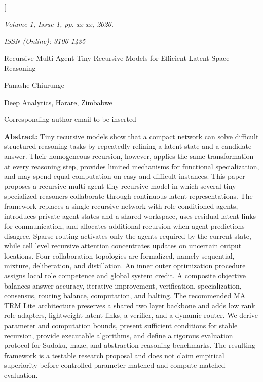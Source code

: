\documentclass[10pt,a4paper,twocolumn]{article}
\begin{document}
\twocolumn[
\begin{@twocolumnfalse}
\noindent\begin{minipage}{0.48\textwidth}
\footnotesize\itshape Volume 1, Issue 1, pp. xx-xx, 2026.
\end{minipage}\hfill
\begin{minipage}{0.48\textwidth}\raggedleft
\footnotesize\itshape ISSN (Online): 3106-1435
\end{minipage}

\vspace{0.20in}
{\centering
{\fontsize{24}{27}\selectfont Recursive Multi Agent Tiny Recursive Models for Efficient Latent Space Reasoning\par}
\vspace{0.14in}
{\fontsize{14}{16}\selectfont Panashe Chiurunge\par}
\vspace{0.04in}
{\fontsize{10}{12}\selectfont Deep Analytics, Harare, Zimbabwe\par}
{\fontsize{10}{12}\selectfont Corresponding author email to be inserted\par}
}
\vspace{0.14in}

\noindent\textbf{Abstract: }Tiny recursive models show that a compact network can solve difficult structured reasoning tasks by repeatedly refining a latent state and a candidate answer. Their homogeneous recursion, however, applies the same transformation at every reasoning step, provides limited mechanisms for functional specialization, and may spend equal computation on easy and difficult instances. This paper proposes a recursive multi agent tiny recursive model in which several tiny specialized reasoners collaborate through continuous latent representations. The framework replaces a single recursive network with role conditioned agents, introduces private agent states and a shared workspace, uses residual latent links for communication, and allocates additional recursion when agent predictions disagree. Sparse routing activates only the agents required by the current state, while cell level recursive attention concentrates updates on uncertain output locations. Four collaboration topologies are formalized, namely sequential, mixture, deliberation, and distillation. An inner outer optimization procedure assigns local role competence and global system credit. A composite objective balances answer accuracy, iterative improvement, verification, specialization, consensus, routing balance, computation, and halting. The recommended MA TRM Lite architecture preserves a shared two layer backbone and adds low rank role adapters, lightweight latent links, a verifier, and a dynamic router. We derive parameter and computation bounds, present sufficient conditions for stable recursion, provide executable algorithms, and define a rigorous evaluation protocol for Sudoku, maze, and abstraction reasoning benchmarks. The resulting framework is a testable research proposal and does not claim empirical superiority before controlled parameter matched and compute matched evaluation.


\end{@twocolumnfalse}
\end{document}
